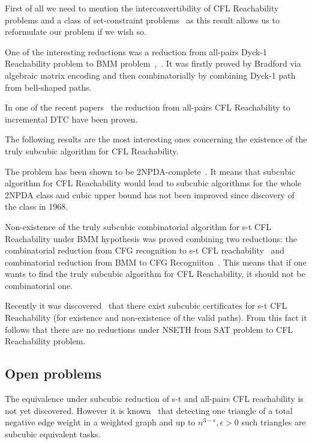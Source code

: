 \documentclass[acmsmall,review,nonacm]{acmart}\settopmatter{printfolios=true,printccs=false,printacmref=false}
\begin{document}
	First of all we need to mention the interconvertibility of CFL Reachability problems and a class of set-constraint problems~\cite{10.1145/258993.259006} as this result allows us to reformulate our problem if we wish so.
	
	One of the interesting reductions was a reduction from  all-pairs Dyck-1 Reachability problem to BMM problem~\cite{bradford2017efficient},~\cite{10.1145/3434315}. It was firstly proved by Bradford via algebraic matrix encoding and then combinatorially by combining Dyck-1 path from bell-shaped paths.
		
	In one of the recent papers~\cite{inbook} the reduction from all-pairs CFL Reachability to incremental DTC have been proven.
	
	The following results are the most interesting ones concerning the existence of  the truly subcubic algorithm for CFL Reachability.
	
	The problem has been shown to be 2NPDA-complete~\cite{10.5555/788019.788876}. It means that subcubic algorithm for CFL Reachability would lead to subcubic algorithms for the whole 2NPDA class and cubic upper bound has not been improved since discovery of the class in 1968.
	
	Non-existence of the truly subcubic combinatorial algorithm for s-t CFL Reachability under BMM hypothesis was proved combining two reductions: the combinatorial reduction from CFG recognition to s-t CFL reachability~\cite{10.1145/3158118} and combinatorial reduction from BMM to CFG Recogniiton~\cite{10.1145/505241.505242}. This means that if one wants to find the truly subcubic algorithm for CFL Reachability, it should not be combinatorial one.
	
	Recently it was discovered~\cite{chistikov2021subcubic} that there exist subcubic certificates for s-t CFL Reachability (for existence and non-existence of the valid paths). From this fact it follows that there are no reductions under NSETH from SAT problem to CFL Reachability problem.

	\subsection{Open problems}
	
	The equivalence under subcubic reduction of s-t and all-pairs CFL reachability is not yet discovered. However it is known~\cite{10.1145/3186893} that detecting one triangle of a total negative edge weight in a weighted graph and up to $n^{3 - \epsilon}, \epsilon > 0$ such triangles are subcubic equivalent tasks. 
	
\end{document}
